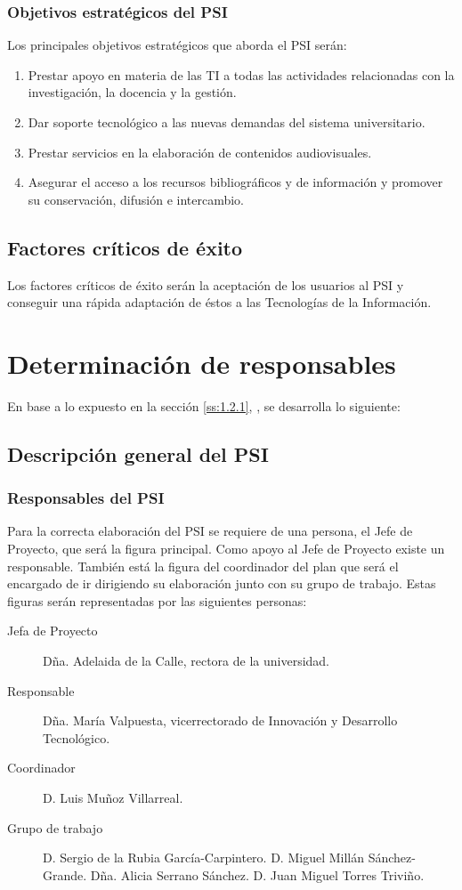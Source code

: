 \documentclass[11pt,a4paper,spanish,twoside]{book}
\begin{document}
\subsubsection{Objetivos estratégicos del PSI}
Los principales objetivos estratégicos que aborda el PSI serán:
\begin{enumerate}
\item Prestar apoyo en materia de las TI a todas las actividades relacionadas
con la investigación, la docencia y la gestión.
\item Dar soporte tecnológico a las nuevas demandas del sistema universitario.
\item Prestar servicios en la elaboración de contenidos audiovisuales.
\item Asegurar el acceso a los recursos bibliográficos y de información y 
promover su conservación, difusión e intercambio.
\end{enumerate}

\subsection{Factores críticos de éxito}
Los factores críticos de éxito serán la aceptación de
los usuarios al PSI y conseguir una rápida adaptación de éstos a las
Tecnologías de la Información.

\section{Determinación de responsables}
En base a lo expuesto en la sección \vref{ss:1.2.1}, \emph{},
se desarrolla lo siguiente:

\subsection{Descripción general del PSI}\label{ss:1.3.1}
\subsubsection{Responsables del PSI}
Para la correcta elaboración del PSI se requiere de una persona, el Jefe de 
Proyecto, que será la figura principal. Como apoyo al Jefe de Proyecto 
existe un responsable. También está la figura del coordinador del plan 
que será el encargado de ir dirigiendo su elaboración junto con su grupo de 
trabajo. Estas figuras serán representadas por las siguientes personas:
\begin{description}
\item[Jefa de Proyecto]
Dña. Adelaida de la Calle, rectora de la universidad.
\item[Responsable]
Dña. María Valpuesta, vicerrectorado de Innovación y Desarrollo Tecnológico.
\item[Coordinador]
D. Luis Muñoz Villarreal.
\item[Grupo de trabajo]
D. Sergio de la Rubia García-Carpintero.
D. Miguel Millán Sánchez-Grande.
Dña. Alicia Serrano Sánchez.
D. Juan Miguel Torres Triviño.
\end{description}
\end{document}
